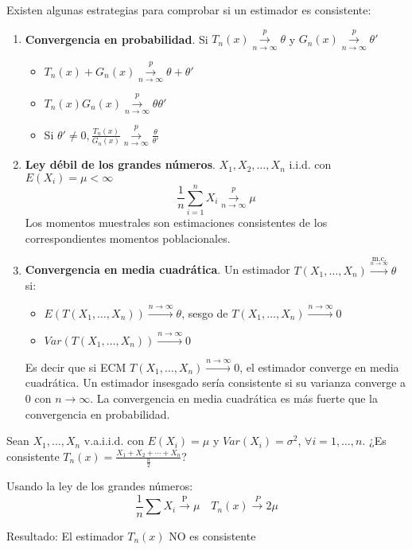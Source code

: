 Existen algunas estrategias para comprobar si un estimador es consistente:
\begin{enumerate}
    \item \textbf{Convergencia en probabilidad}. Si $T_n(x) \overset{p}{\underset{n \to \infty}{\to}} \theta$ y $G_n(x) \overset{p}{\underset{n \to \infty}{\to}} \theta'$
          \begin{itemize}
              \item $T_n(x)+G_n(x) \overset{p}{\underset{n \to \infty}{\to}} \theta + \theta '$
              \item $T_n(x)G_n(x) \overset{p}{\underset{n \to \infty}{\to}} \theta\theta '$
              \item Si $\theta' \neq 0, \frac{T_n(x)}{G_n(x)} \overset{p}{\underset{n \to \infty}{\to}} \frac{\theta}{\theta '}$
          \end{itemize}

    \item \textbf{Ley débil de los grandes números}. $X_1, X_2, \dots, X_n$ i.i.d. con $E(X_i)=\mu < \infty$
          \[\frac{1}{n}\sum_{i=1}^{n} X_i \overset{p}{\underset{n \to \infty}{\to}} \mu\]
          Los momentos muestrales son estimaciones consistentes de los correspondientes momentos poblacionales.

    \item \textbf{Convergencia en media cuadrática}. Un estimador $T(X_1, \dots, X_n)\xrightarrow{\underset{n \to \infty}{\text{m.c.}}} \theta$ si:
          \begin{itemize}
              \item $E(T(X_1, \dots, X_n)) \xrightarrow{{n \to \infty}} \theta$, sesgo de $T(X_1, \dots, X_n)\xrightarrow{{n \to \infty}} 0$
              \item $Var(T(X_1, \dots, X_n)) \xrightarrow{{n \to \infty}} 0$
          \end{itemize}
          Es decir que si ECM $T(X_1, \dots, X_n) \xrightarrow{{n \to \infty}} 0$, el estimador converge en media cuadrática. Un estimador insesgado sería consistente si su varianza converge a 0 con $n \to \infty$. La convergencia en media cuadrática es más fuerte que la convergencia en probabilidad.
\end{enumerate}

\begin{theorem}
    Sean $X_1, \dots, X_n$ v.a.i.i.d. con $E(X_i)=\mu$ y $Var(X_i)=\sigma^2$, $\forall i=1, \dots, n$. ¿Es consistente $T_n(x) = \frac{X_1 + X_2 + \dotsb + X_n}{\frac{n}{2}}$?

    Usando la ley de los grandes números:
    \[
        \frac{1}{n}\sum X_i \xrightarrow{\text{P}} \mu \quad T_n(x)\xrightarrow{P}2\mu
    \]

    Resultado: El estimador $T_n(x)$ NO es consistente
\end{theorem}

